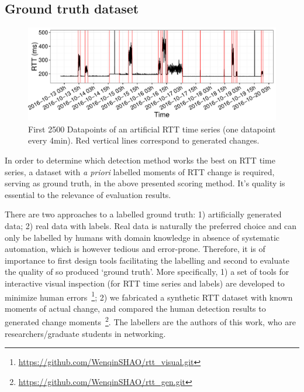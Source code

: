 \subsection{Ground truth dataset}
\label{sec:label}

\begin{figure}[!htb]
\centering
\includegraphics[width=.96\textwidth]{gfx/chap4/artificial_trace.pdf}
\caption{First 2500 %
Datapoints of an artificial RTT time series (one datapoint every 4min). 
Red vertical lines correspond to generated changes.}
\label{fig:art_example}
\end{figure}

In order to determine which detection method works the best on RTT time series, 
a dataset with \textit{a priori} labelled moments of RTT change is required, serving as ground truth, in the above presented scoring method. It's quality is essential to the relevance of evaluation results.

There are two approaches to a labelled ground truth: 1) artificially generated data; 2) real data with labels.
Real data is naturally the preferred choice and 
can only be labelled by humans with domain knowledge in absence of systematic automation, which is however tedious and error-prone. 
Therefore, it is of importance to first design tools facilitating the labelling and second to evaluate the quality of so produced `ground truth'.
More specifically, 1) a set of tools for interactive visual inspection (for RTT time series and labels) are developed to minimize human errors~\footnote{\url{https://github.com/WenqinSHAO/rtt_visual.git}}; 2) we fabricated a synthetic RTT dataset with known moments of actual change, and compared the human detection results to generated change moments~\footnote{\url{https://github.com/WenqinSHAO/rtt_gen.git}}. The labellers are the authors of this work, who are researchers/graduate students in networking. 

